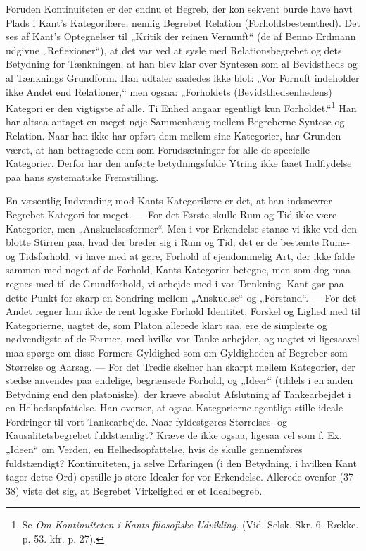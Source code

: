 \documentclass[12pt,a4paper]{book}
\newcommand{\opage}[1]{\marginnote{\footnotesize\textit{[#1]}}}
\newcommand{\apage}[1]{\marginnote{\footnotesize\textit{[#1]}}}
\begin{document}
Foruden Kontinuiteten er der endnu et Begreb, der kon%
\opage{146}sekvent burde have
havt Plads i Kant's Kategorilære, nemlig Begrebet Relation
(Forholdsbestemthed). Det ses af Kant's Optegnelser til „Kritik der
reinen Vernunft“ (de af Benno Erdmann udgivne „Reflexioner“), at det var
ved at sysle med Relationsbegrebet og dets Betydning for Tænkningen, at
han blev klar over Syntesen som al Bevidstheds og al Tænknings Grundform.
Han udtaler saaledes ikke blot: „Vor Fornuft indeholder ikke Andet end
Relationer,“ men ogsaa: „Forholdets (Bevidsthedsenhedens) Kategori er den
vigtigste af alle. Ti Enhed angaar egentligt kun Forholdet.“\footnote{Se
\emph{Om Kontinuiteten i Kants filosofiske Udvikling}. (Vid. Selsk. Skr.
6. Række. p. 53. kfr. p. 27).} Han har altsaa antaget en meget nøje
Sammenhæng mellem Begreberne Syntese og Relation. Naar han ikke har
opført dem mellem sine Kategorier, har Grunden været, at han betragtede
dem som Forudsætninger for alle de specielle Kategorier. Derfor har den
anførte betydningsfulde Ytring ikke faaet Indflydelse paa hans
systematiske Fremstilling.

En væsentlig Indvending mod Kants Kategorilære er det, at han indsnevrer
Begrebet Kategori for meget. --- For det Første skulle Rum og Tid ikke
være Kategorier, men „Anskuelsesformer“. Men i vor Erkendelse stanse vi
ikke ved den blotte Stirren paa, hvad der breder sig i Rum og Tid; det er
de bestemte Rums- og Tidsforhold, vi have med at gøre, Forhold af
ejendommelig Art, der ikke falde sammen med noget af de Forhold, Kants
Kategorier betegne, men som dog maa regnes med til de Grundforhold, vi
arbejde med i vor Tænkning. Kant gør paa dette Punkt for skarp en
Sondring mellem „Anskuelse“ og „Forstand“. --- For det Andet regner han
ikke de rent logiske Forhold Identitet, Forskel og Lighed med til
Kategorierne, uagtet de, som Platon allerede klart saa, ere de simpleste
og nødvendigste af de Former, med hvilke vor Tanke arbejder, og uagtet vi
ligesaavel maa spørge om disse Formers Gyldighed som om Gyldigheden af
Begreber som Størrelse og Aarsag. --- For det Tredie skelner han skarpt
mellem Kategorier, der stedse anvendes paa endelige, begrænsede Forhold,
og „Ideer“ (tildels \apage{147} i en anden Betydning end den platoniske), der kræve
absolut Afslutning af Tankearbejdet i en Helhedsopfattelse. Han overser,
at ogsaa Kategorierne egentligt stille ideale Fordringer til vort
Tankearbejde. Naar fyldestgøres Størrelses- og Kausalitetsbegrebet
fuldstændigt? Kræve de ikke ogsaa, ligesaa vel som f. Ex. „Ideen“ om
Verden, en Helhedsopfattelse, hvis de skulle gennemføres fuldstændigt?
Kontinuiteten, ja selve Erfaringen (i den Betydning, i hvilken Kant tager
dette Ord) opstille jo store Idealer for vor Erkendelse. Allerede ovenfor
(37--38) viste det sig, at Begrebet Virkelighed er et Idealbegreb.
\end{document}
